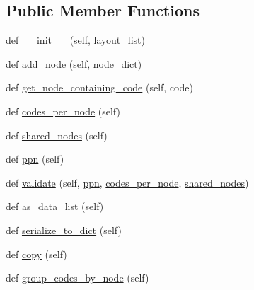\subsection*{Public Member Functions}
\begin{DoxyCompactItemize}
\item 
def \hyperlink{classcodar_1_1savanna_1_1node__layout_1_1_node_layout_af898ee59a1a5f520328a53d3b60a62d0}{\+\_\+\+\_\+init\+\_\+\+\_\+} (self, \hyperlink{classcodar_1_1savanna_1_1node__layout_1_1_node_layout_af27f209b198b9491d57d2bb3e65abc34}{layout\+\_\+list})
\item 
def \hyperlink{classcodar_1_1savanna_1_1node__layout_1_1_node_layout_ab0b94ca4a741efab71db5a598a782c38}{add\+\_\+node} (self, node\+\_\+dict)
\item 
def \hyperlink{classcodar_1_1savanna_1_1node__layout_1_1_node_layout_ae63a2f3c26294b78b35af77af4063899}{get\+\_\+node\+\_\+containing\+\_\+code} (self, code)
\item 
def \hyperlink{classcodar_1_1savanna_1_1node__layout_1_1_node_layout_add6c0879f2b8995f83cf07aaa09b7bbf}{codes\+\_\+per\+\_\+node} (self)
\item 
def \hyperlink{classcodar_1_1savanna_1_1node__layout_1_1_node_layout_a90f88aa1b664e9e9ed2b69e898c4581a}{shared\+\_\+nodes} (self)
\item 
def \hyperlink{classcodar_1_1savanna_1_1node__layout_1_1_node_layout_aa6d5b7f3721c264b0eeb3f7e7351c658}{ppn} (self)
\item 
def \hyperlink{classcodar_1_1savanna_1_1node__layout_1_1_node_layout_a9b1ef6ea6e08f60a04891db7ee460990}{validate} (self, \hyperlink{classcodar_1_1savanna_1_1node__layout_1_1_node_layout_aa6d5b7f3721c264b0eeb3f7e7351c658}{ppn}, \hyperlink{classcodar_1_1savanna_1_1node__layout_1_1_node_layout_add6c0879f2b8995f83cf07aaa09b7bbf}{codes\+\_\+per\+\_\+node}, \hyperlink{classcodar_1_1savanna_1_1node__layout_1_1_node_layout_a90f88aa1b664e9e9ed2b69e898c4581a}{shared\+\_\+nodes})
\item 
def \hyperlink{classcodar_1_1savanna_1_1node__layout_1_1_node_layout_ac75f6e66031d9e5c2f47ac0450335536}{as\+\_\+data\+\_\+list} (self)
\item 
def \hyperlink{classcodar_1_1savanna_1_1node__layout_1_1_node_layout_ae830687f476fdcc4036f141f3caad48b}{serialize\+\_\+to\+\_\+dict} (self)
\item 
def \hyperlink{classcodar_1_1savanna_1_1node__layout_1_1_node_layout_aa3b19766879e91de1698bb47d7149809}{copy} (self)
\item 
def \hyperlink{classcodar_1_1savanna_1_1node__layout_1_1_node_layout_a3f6f326ba64b563322c2b745775ab82b}{group\+\_\+codes\+\_\+by\+\_\+node} (self)

\end{DoxyCompactItemize}
